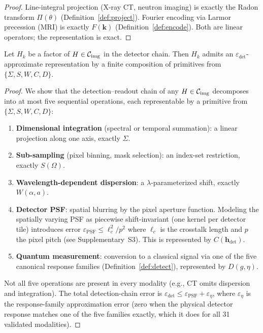 \documentclass[11pt]{article}
\begin{document}
\begin{proof}
Line-integral projection (X-ray CT, neutron imaging) is exactly the Radon transform $\Pi(\theta)$ (Definition~\ref{def:project}). Fourier encoding via Larmor precession (MRI) is exactly $F(\mathbf{k})$ (Definition~\ref{def:encode}). Both are linear operators; the representation is exact.
\end{proof}

\begin{lemma}
\label{lem:detect}
Let $H_k$ be a factor of $H \in \mathcal{C}_{\mathrm{img}}$ in the detector chain. Then $H_k$ admits an $\varepsilon_{\mathrm{det}}$-approximate representation by a finite composition of primitives from $\{\Sigma, S, W, C, D\}$.
\end{lemma}

\begin{proof}
We show that the detection--readout chain of any $H \in \mathcal{C}_{\mathrm{img}}$ decomposes into at most five sequential operations, each representable by a primitive from $\{\Sigma, S, W, C, D\}$:
\begin{enumerate}
  \item \textbf{Dimensional integration} (spectral or temporal summation): a linear projection along one axis, exactly $\Sigma$.
  \item \textbf{Sub-sampling} (pixel binning, mask selection): an index-set restriction, exactly $S(\Omega)$.
  \item \textbf{Wavelength-dependent dispersion}: a $\lambda$-parameterized shift, exactly $W(\alpha, a)$.
  \item \textbf{Detector PSF}: spatial blurring by the pixel aperture function. Modeling the spatially varying PSF as piecewise shift-invariant (one kernel per detector tile) introduces error $\varepsilon_{\mathrm{PSF}} \leq \ell_c^2/p^2$ where $\ell_c$ is the crosstalk length and $p$ the pixel pitch (see Supplementary~S3). This is represented by $C(\mathbf{h}_{\mathrm{det}})$.
  \item \textbf{Quantum measurement}: conversion to a classical signal via one of the five canonical response families (Definition~\ref{def:detect}), represented by $D(g, \eta)$.
\end{enumerate}
Not all five operations are present in every modality (e.g., CT omits dispersion and integration). The total detection-chain error is $\varepsilon_{\mathrm{det}} \leq \varepsilon_{\mathrm{PSF}} + \varepsilon_{\eta}$, where $\varepsilon_{\eta}$ is the response-family approximation error (zero when the physical detector response matches one of the five families exactly, which it does for all 31 validated modalities).
\end{proof}
\end{document}
